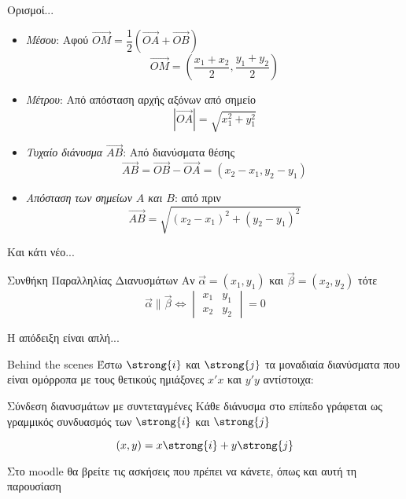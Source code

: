 \documentclass[greek]{beamer}
\begin{document}
\begin{frame}{Ορισμοί...}
      \begin{itemize}
            \item<1-> \emph{Μέσου}: Αφού $\overrightarrow{ΟΜ}=\dfrac{1}{2}\left( \overrightarrow{ΟΑ}+\overrightarrow{ΟΒ}\right)$
                  $$\overrightarrow{ΟΜ}=\left(\dfrac{x_1+x_2}{2},\dfrac{y_1+y_2}{2}\right)$$
            \item<2-> \emph{Μέτρου}: Από απόσταση αρχής αξόνων από σημείο
                  $$|\overrightarrow{ΟΑ}|=\sqrt{x_1^2+y_1^2}$$
            \item<3-> \emph{Τυχαίο διάνυσμα $\overrightarrow{ΑΒ}$}: Από διανύσματα θέσης
                  $$\overrightarrow{ΑΒ}=\overrightarrow{ΟΒ}-\overrightarrow{ΟΑ}=(x_2-x_1,y_2-y_1)$$
            \item<4-> \emph{Aπόσταση των σημείων $Α$ και $Β$}: από πριν
                  $$\overrightarrow{ΑΒ}=\sqrt{(x_2-x_1)^2+(y_2-y_1)^2}$$
      \end{itemize}
\end{frame}

\begin{frame}{Και κάτι νέο...}
      \begin{block}{Συνθήκη Παραλληλίας Διανυσμάτων}
            Αν $\vec{α}=(x_1,y_1)$ και $\vec{β}=(x_2,y_2)$ τότε
            $$\vec{α} 	\parallel \vec{β} \iff \begin{vmatrix}
                        x_1 & y_1 \\
                        x_2 & y_2
                  \end{vmatrix}=0$$
      \end{block} \pause
      Η απόδειξη είναι απλή...
\end{frame}

\begin{frame}{Behind the scenes}
      Έστω $\strong{i}$ και $\strong{j}$ τα μοναδιαία διανύσματα που είναι ομόρροπα με τους θετικούς ημιάξονες $x'x$ και $y'y$ αντίστοιχα:
      \begin{block}{Σύνδεση διανυσμάτων με συντεταγμένες}
            Κάθε διάνυσμα στο επίπεδο γράφεται ως γραμμικός συνδυασμός των $\strong{i}$ και $\strong{j}$

            $$(x,y)=x\strong{i}+y\strong{j}$$
      \end{block}
\end{frame}

\begin{frame}
      Στο moodle θα βρείτε τις ασκήσεις που πρέπει να κάνετε, όπως και αυτή τη παρουσίαση
\end{frame}
\end{document}
